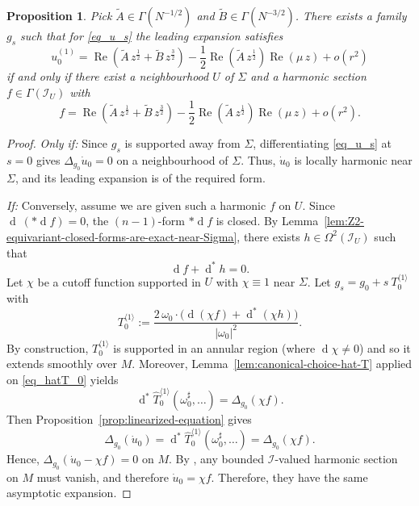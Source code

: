 \documentclass[11pt]{amsart}
\renewcommand{\d}{\operatorname{d}}
\renewcommand{\Re}{\operatorname{Re}}
\newtheorem{proposition}[theorem]{Proposition}
\begin{document}
\begin{proposition}
	\label{prop:metric-variation-leading-term}
	Pick \(\widetilde A\in \Gamma(N^{-1/2})\) and \(\widetilde B\in \Gamma(N^{-3/2})\).
	There exists a family \(g_s\) such that for \eqref{eq_u_s} the leading expansion satisfies
	\[
	u_0^{(1)} = \Re \left(\widetilde A \, z^{\frac{1}{2}} + \widetilde B \, z^{\frac{3}{2}}\right)
	- \frac{1}{2} \Re \left( \widetilde  A\, z^{\frac{1}{2}}\right) \Re \left( \mu \, z\right)
	+ o(r^2)
	\]
	if and only if there exist a neighbourhood \(U\) of \(\Sigma\) and a harmonic section \(f\in \Gamma(\mathcal I_U)\) with
	\[
	f = \Re \left(\widetilde A \, z^{\frac{1}{2}} + \widetilde B \, z^{\frac{3}{2}}\right)
	- \frac{1}{2} \Re \left( \widetilde  A\, z^{\frac{1}{2}}\right) \Re \left( \mu \, z\right)
	+ o(r^2).
	\]
\end{proposition}

\begin{proof}
	\noindent\emph{Only if:}
	Since \(g_s\) is supported away from \(\Sigma\), differentiating \eqref{eq_u_s} at \(s=0\) gives
	\(\Delta_{g_0}\dot u_0=0\) on a neighbourhood of \(\Sigma\).
	Thus, \(\dot u_0\) is locally harmonic near \(\Sigma\), and its leading expansion is of the required form.
	
	\smallskip
	\noindent\emph{If:}
	Conversely, assume we are given such a harmonic \(f\) on \(U\).
	Since \(\d\:(*\d f)=0\), the \((n-1)\)-form \(*\d f\) is closed.
	By Lemma~\ref{lem:Z2-equivariant-closed-forms-are-exact-near-Sigma}, there exists \(h\in \Omega^{2}(\mathcal I_U)\) such that
	\[
	\d f + \d^*h = 0.
	\]
	Let \(\chi\) be a cutoff function supported in \(U\) with \(\chi\equiv 1\) near \(\Sigma\).
	Let $g_s = g_0 + s \: T^{\langle 1 \rangle}_0$ with 
	\begin{equation}\label{eq_hatT_0}
		T^{\langle 1 \rangle}_0
		:= \frac{2\,\omega_0\cdot\bigl(\d(\chi f)+\d^*(\chi h)\bigr)}{|\omega_0|^2}.
	\end{equation}
	By construction, $T^{\langle 1 \rangle}_0$ is supported in an annular region (where \(\d\chi\neq 0\)) and so it extends smoothly over $M$.
	Moreover, Lemma~\ref{lem:canonical-choice-hat-T} applied on \eqref{eq_hatT_0} yields
	\[
	\d^*\widehat T_0^{\langle 1\rangle}(\omega_0^\sharp,\ldots)=\Delta_{g_0}(\chi f).
	\]
	Then Proposition~\ref{prop:linearized-equation} gives
	\[
	\Delta_{g_0}(\dot u_0)=\d^*\widehat T_0^{\langle 1\rangle}(\omega_0^\sharp,\ldots)
	=\Delta_{g_0}(\chi f).
	\]
	Hence, \(\Delta_{g_0}(\dot u_0-\chi f)=0\) on \(M\).
	By \cite[Section~2]{Donaldson2021}, any bounded \(\mathcal I\)-valued harmonic section on \(M\) must vanish, and therefore \(\dot u_0=\chi f\).
	Therefore, they have the same asymptotic expansion.
\end{proof}
\end{document}

